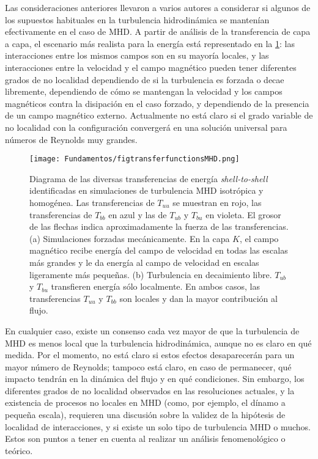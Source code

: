 Las consideraciones anteriores llevaron a varios autores a considerar
si algunos de los supuestos habituales en la turbulencia hidrodinámica
se mantenían efectivamente en el caso de MHD. A partir de análisis de
la transferencia de capa a capa, el escenario más realista para la
energía está representado en la \cref{fig:transferfunctionsMHD}: las
interacciones entre los mismos campos son en su mayoría locales, y las
interacciones entre la velocidad y el campo magnético pueden tener
diferentes grados de no localidad dependiendo de si la turbulencia es
forzada o decae libremente, dependiendo de cómo se mantengan la
velocidad y los campos magnéticos contra la disipación en el caso
forzado, y dependiendo de la presencia de un campo magnético
externo. Actualmente no está claro si el grado variable de no
localidad con la configuración convergerá en una solución universal
para números de Reynolds muy grandes.
\begin{figure}[h!]
  \centering
  \texttt{[image: Fundamentos/figtransferfunctionsMHD.png]}
  \caption{Diagrama de las diversas transferencias de energía
    \emph{shell-to-shell} identificadas en simulaciones de turbulencia
    MHD isotrópica y homogénea. Las transferencias de $T_{uu}$ se
    muestran en rojo, las transferencias de $T_{bb}$ en azul y las de
    $T_{ub}$ y $T_{bu}$ en violeta. El grosor de las flechas indica
    aproximadamente la fuerza de las transferencias. (a) Simulaciones
    forzadas mecánicamente. En la capa $K$, el campo magnético recibe
    energía del campo de velocidad en todas las escalas más grandes y
    le da energía al campo de velocidad en escalas ligeramente más
    pequeñas. (b) Turbulencia en decaimiento libre. $T_{ub}$ y
    $T_{bu}$ transfieren energía sólo localmente. En ambos casos, las
    transferencias $T_{uu}$ y $T_{bb}$ son locales y dan la mayor
    contribución al flujo.}
  \label{fig:transferfunctionsMHD}
\end{figure}

En cualquier caso, existe un consenso cada vez mayor de que la
turbulencia de MHD es menos local que la turbulencia hidrodinámica,
aunque no es claro en qué medida. Por el momento, no está claro si
estos efectos desaparecerán para un mayor número de Reynolds; tampoco
está claro, en caso de permanecer, qué impacto tendrán en la dinámica
del flujo y en qué condiciones. Sin embargo, los diferentes grados de
no localidad observados en las resoluciones actuales, y la existencia
de procesos no locales en MHD (como, por ejemplo, el dínamo a pequeña
escala), requieren una discusión sobre la validez de la hipótesis de
localidad de interacciones, y si existe un solo tipo de turbulencia
MHD o muchos. Estos son puntos a tener en cuenta al realizar un
análisis fenomenológico o teórico.


